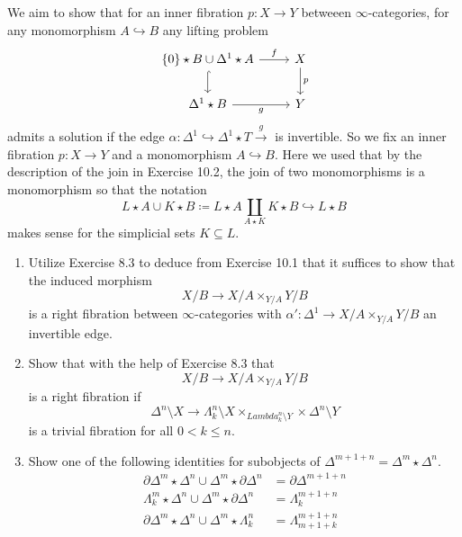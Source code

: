 \begin{Exercise}
	We aim to show that for an inner fibration $ p \colon X \to Y $ betweeen $ \infty $-categories, for any monomorphism $ A \hookrightarrow B $ any lifting problem
	\[
	\begin{tikzcd}
		\{ 0 \} \star B \cup \Delta^1 \star A
		\ar[d, hook]
		\ar[r, "f"]
		& 
		X
		\ar[d, "p"]
		\\
		\Delta^1 \star B 
		\ar[r, " g"' ]
		&
		Y
	\end{tikzcd}
	\]
	admits a solution if the edge $ \alpha \colon \Delta^1 \hookrightarrow \Delta^1 \star T 
	\xrightarrow{ g } $ is invertible.
	So we fix an inner fibration $ p \colon X \to Y $ and a monomorphism $ A \hookrightarrow B $.
	Here we used that by the description of the join in Exercise 10.2, the join of two monomorphisms is a monomorphism so that the notation
	\[
	L \star A \cup K \star B 
	\coloneqq 
	L \star A 
	\coprod_{ A \star K } 
	K \star B 
	\hookrightarrow 
	L \star B
	\]
	makes sense for the simplicial sets $ K \subseteq L $.
	\begin{enumerate}[label=(\alph*)]
		\item 
		Utilize Exercise 8.3 to deduce from Exercise 10.1 that it suffices to show that the induced morphism 
		\[
		X / B 
		\to 
		X / A 
		\times_{ Y / A }
		Y / B 
		\]
		is a right fibration between $ \infty $-categories with $ \alpha' \colon \Delta^1 \to X / A \times_{ Y / A } Y / B $ an invertible edge.
		
		\item 
		Show that with the help of Exercise 8.3
		that 
		\[
		X / B 
		\to
		X / A \times_{ Y / A } Y / B  
		\]
		is a right fibration if 
		\[
		\Delta^n \setminus X 
		\to
		\Lambda_k^n \setminus X \times_{ Lambda_k^n \setminus Y } \times \Delta^n \setminus Y
		\]
		is a trivial fibration for all $ 0 < k \leq n $.
		
		\item 
		Show one of the following identities for subobjects of $ \Delta^{ m + 1 + n } = \Delta^m \star \Delta^n $.
		\begin{align}
			\partial \Delta^m \star \Delta^n \cup \Delta^m \star \partial \Delta^n
			&=
			\partial \Delta^{ m + 1 + n }
			\\
			\Lambda_k^m \star \Delta^n \cup \Delta^m \star \partial \Delta^n
			&=
			\Lambda_k^{ m + 1 + n }
			\\
			\partial \Delta^m \star \Delta^n \cup \Delta^m \star \Lambda_k^n 
			&=
			\Lambda_{ m + 1 + k }^{ m + 1 + n }
		\end{align}
		

\end{enumerate}
\end{Exercise}
